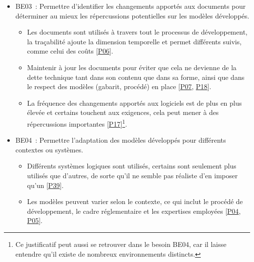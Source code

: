 {\begin{itemize}[label={}, leftmargin=*]
    \item BE03~: Permettre d’identifier les changements apportés aux documents pour déterminer au mieux les répercussions potentielles sur les modèles développés.
    \begin{itemize}
    \item Les documents sont utilisés à travers tout le processus de développement, la traçabilité ajoute la dimension temporelle et permet différents suivis, comme celui des coûts [\hyperref[paragraphe:P009]{P06}].
    \item Maintenir à jour les documents pour éviter que cela ne devienne de la dette technique tant dans son contenu que dans sa forme, ainsi que dans le respect des modèles (gabarit, procédé) en place [\hyperref[paragraphe:P010]{P07}, \hyperref[paragraphe:P024]{P18}].
    \item La fréquence des changements apportés aux logiciels est de plus en plus élevée et certains touchent aux exigences, cela peut mener à des répercussions importantes  [\hyperref[paragraphe:P023]{P17}]\footnote{Ce justificatif peut aussi se retrouver dans le besoin BE04, car il laisse entendre qu'il existe de nombreux environnements distincts.}.
    \end{itemize}
    
    \item BE04~: Permettre l'adaptation des modèles développés pour différents contextes ou systèmes.
    \begin{itemize}
    \item Différents systèmes logiques sont utilisés, certains sont seulement plus utilisés que d'autres, de sorte qu'il ne semble pas réaliste d'en imposer qu'un [\hyperref[paragraphe:P053]{P39}].
    \item Les modèles peuvent varier selon le contexte, ce qui inclut le procédé de développement, le cadre réglementaire et les expertises employées [\hyperref[paragraphe:P007]{P04}, \hyperref[paragraphe:P008]{P05}].
    \end{itemize}
    

\end{itemize}}

